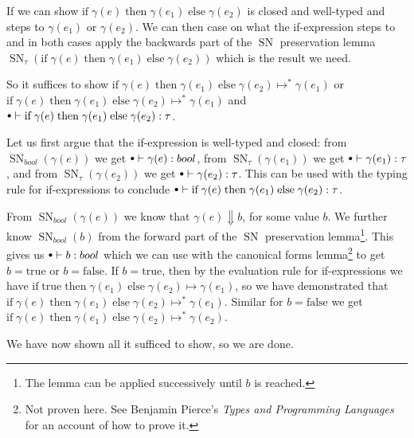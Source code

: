 \documentclass[a4paper,10pt,fleqn]{article}
\DeclareMathOperator{\SNPred}{SN}
\newcommand{\evalto}{\ensuremath{\mapsto}}
\newcommand{\evaltos}[1][*]{\ensuremath{\evalto^{#1}}}
\newcommand{\mtenv}{{\raisebox{1.5pt}{$\scriptstyle\bullet$}}}
\newcommand{\eif}[3]{\ensuremath{ \text{if}\; #1 \; \text{then} \; #2 \; \text{else} \; #3}}
\newcommand{\true}{\ensuremath{\text{true}}}
\newcommand{\false}{\ensuremath{\text{false}}}
\newcommand{\SN}[2]{\ensuremath{\SNPred_{#1}(#2)}}
\begin{document}
If we can show $\eif{\gamma(e)}{\gamma(e_1)}{\gamma(e_2)}$ is closed and well-typed and steps to $\gamma(e_1)$ or $\gamma(e_2)$. We can then case on what the if-expression steps to and in both cases apply the backwards part of the $\SNPred$ preservation lemma $\SN{\tau}{\eif{\gamma(e)}{\gamma(e_1)}{\gamma(e_2)}}$ which is the result we need.

So it suffices to show $\eif{\gamma(e)}{\gamma(e_1)}{\gamma(e_2)} \evaltos \gamma(e_1)$ or $\eif{\gamma(e)}{\gamma(e_1)}{\gamma(e_2)} \evaltos \gamma(e_1)$ and $\mtenv \vdash \eif{\gamma(e)}{\gamma(e_1)}{\gamma(e_2)} : \tau$. 

Let us first argue that the if-expression is well-typed and closed: from $\SN{bool}{\gamma(e)}$ we get $\mtenv \vdash \gamma(e) : bool$, from $\SN{\tau}{\gamma(e_1)}$ we get $\mtenv \vdash \gamma(e_1) : \tau$, and from $\SN{\tau}{\gamma(e_2)}$ we get $\mtenv \vdash \gamma(e_2) : \tau$. This can be used with the typing rule for if-expressions to conclude $\mtenv \vdash \eif{\gamma(e)}{\gamma(e_1)}{\gamma(e_2)} : \tau$.

From $\SN{bool}{\gamma(e)}$ we know that $\gamma(e) \Downarrow b$, for some value $b$. We further know $\SN{bool}{b}$ from the forward part of the $\SNPred$ preservation lemma\footnote{The lemma can be applied successively until $b$ is reached.}. This gives us $\mtenv \vdash b : bool$ which we can use with the canonical forms lemma\footnote{Not proven here. See Benjamin Pierce's \emph{Types and Programming Languages} for an account of how to prove it.} to get $b=\true$ or $b=\false$. If $b=\true$, then by the evaluation rule for if-expressions we have $\eif{\true}{\gamma(e_1)}{\gamma(e_2)} \evalto \gamma(e_1)$, so we have demonstrated that $\eif{\gamma(e)}{\gamma(e_1)}{\gamma(e_2)} \evaltos \gamma(e_1)$. Similar for $b = \false$ we get $\eif{\gamma(e)}{\gamma(e_1)}{\gamma(e_2)} \evaltos \gamma(e_2)$.

We have now shown all it sufficed to show, so we are done.
\end{document}
